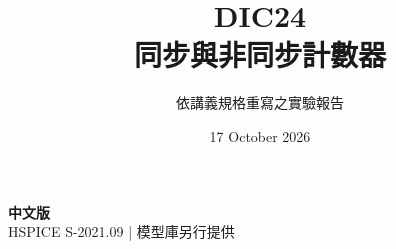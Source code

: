 \documentclass[11pt,a4paper]{article}
\title{\color{accent}DIC24\\[4pt]同步與非同步計數器}
\author{依講義規格重寫之實驗報告}
\date{17 October 2026}
\begin{document}
\maketitle
\begin{center}\small\textbf{中文版}\\
HSPICE S-2021.09 \quad | \quad 模型庫另行提供
\end{center}


\end{document}
